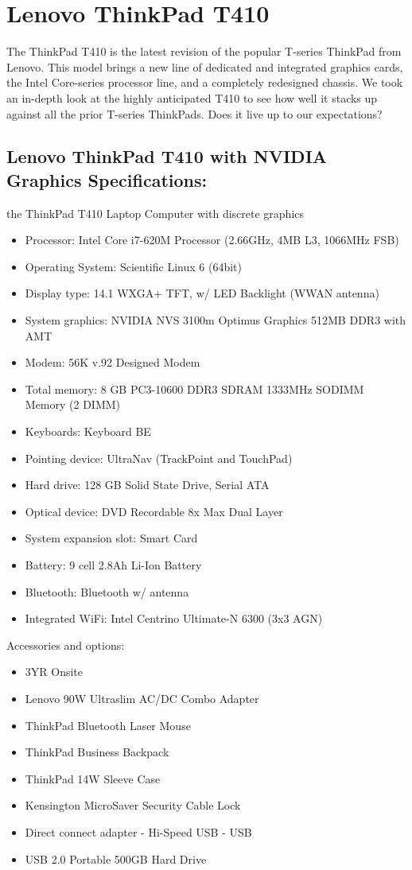 \chapter{Lenovo ThinkPad T410}

The ThinkPad T410 is the latest revision of the popular T-series ThinkPad from
Lenovo. This model brings a new line of dedicated and integrated graphics cards,
the Intel Core-series processor line, and a completely redesigned chassis.
We took an in-depth look at the highly anticipated T410 to see how well it stacks
up against all the prior T-series ThinkPads. Does it live up to our expectations?

\section{Lenovo ThinkPad T410 with NVIDIA Graphics Specifications:}
the ThinkPad T410 Laptop Computer with discrete graphics
\begin{itemize}
  \item Processor: Intel Core i7-620M Processor (2.66GHz, 4MB L3, 1066MHz FSB)
  \item Operating System: Scientific Linux 6 (64bit)
  \item Display type:	14.1 WXGA+ TFT, w/ LED Backlight (WWAN antenna)
  \item System graphics:	NVIDIA NVS 3100m Optimus Graphics 512MB DDR3 with AMT
  \item Modem:	56K v.92 Designed Modem
  \item Total memory:	8 GB PC3-10600 DDR3 SDRAM 1333MHz SODIMM Memory (2 DIMM)
  \item Keyboards:	Keyboard BE
  \item Pointing device:	UltraNav (TrackPoint and TouchPad)
  \item Hard drive:	128 GB Solid State Drive, Serial ATA
  \item Optical device:	DVD Recordable 8x Max Dual Layer
  \item System expansion slot:	Smart Card
  \item Battery:	9 cell 2.8Ah Li-Ion Battery
  \item Bluetooth:	Bluetooth w/ antenna
  \item Integrated WiFi:	Intel Centrino Ultimate-N 6300 (3x3 AGN)
\end{itemize}
Accessories and options:
\begin{itemize}
  \item 3YR Onsite
  \item Lenovo 90W Ultraslim AC/DC Combo Adapter
  \item ThinkPad Bluetooth Laser Mouse
  \item ThinkPad Business Backpack
  \item ThinkPad 14W Sleeve Case
  \item Kensington MicroSaver Security Cable Lock
  \item Direct connect adapter - Hi-Speed USB - USB
  \item USB 2.0 Portable 500GB Hard Drive
\end{itemize}

